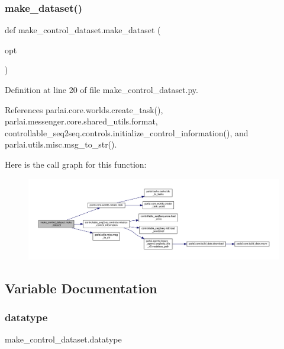 \subsubsection{\texorpdfstring{make\+\_\+dataset()}{make\_dataset()}}
{\footnotesize\ttfamily def make\+\_\+control\+\_\+dataset.\+make\+\_\+dataset (\begin{DoxyParamCaption}\item[{}]{opt }\end{DoxyParamCaption})}



Definition at line 20 of file make\+\_\+control\+\_\+dataset.\+py.



References parlai.\+core.\+worlds.\+create\+\_\+task(), parlai.\+messenger.\+core.\+shared\+\_\+utils.\+format, controllable\+\_\+seq2seq.\+controls.\+initialize\+\_\+control\+\_\+information(), and parlai.\+utils.\+misc.\+msg\+\_\+to\+\_\+str().

Here is the call graph for this function\+:
\nopagebreak
\begin{figure}[H]
\begin{center}
\leavevmode
\includegraphics[width=350pt]{namespacemake__control__dataset_ab015bf05433a8280052368fd2b16ec1b_cgraph}
\end{center}
\end{figure}


\subsection{Variable Documentation}
\mbox{\label{namespacemake__control__dataset_a98700f4d0d81fda1d8b0965cb134c7df}} 
\subsubsection{\texorpdfstring{datatype}{datatype}}
{\footnotesize\ttfamily make\+\_\+control\+\_\+dataset.\+datatype}



